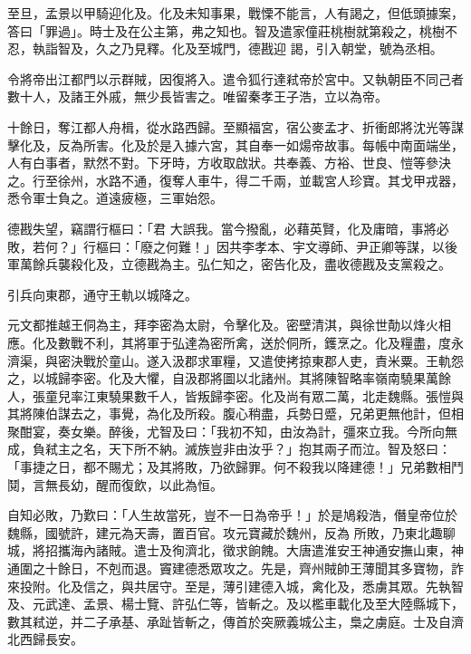 \begin{pinyinscope}
 至旦，孟景以甲騎迎化及。化及未知事果，戰慄不能言，人有謁之，但低頭據案，答曰「罪過」。時士及在公主第，弗之知也。智及遣家僮莊桃樹就第殺之，桃樹不忍，執詣智及，久之乃見釋。化及至城門，德戡迎
 謁，引入朝堂，號為丞相。



 令將帝出江都門以示群賊，因復將入。遣令狐行達弒帝於宮中。又執朝臣不同己者數十人，及諸王外戚，無少長皆害之。唯留秦孝王子浩，立以為帝。



 十餘日，奪江都人舟楫，從水路西歸。至顯福宮，宿公麥孟才、折衝郎將沈光等謀擊化及，反為所害。化及於是入據六宮，其自奉一如煬帝故事。每帳中南面端坐，人有白事者，默然不對。下牙時，方收取啟狀。共奉義、方裕、世良、愷等參決之。行至徐州，水路不通，復奪人車牛，得二千兩，並載宮人珍寶。其戈甲戎器，悉令軍士負之。道遠疲極，三軍始怨。



 德戡失望，竊謂行樞曰：「君
 大誤我。當今撥亂，必藉英賢，化及庸暗，事將必敗，若何？」行樞曰：「廢之何難！」因共李孝本、宇文導師、尹正卿等謀，以後軍萬餘兵襲殺化及，立德戡為主。弘仁知之，密告化及，盡收德戡及支黨殺之。



 引兵向東郡，通守王軌以城降之。



 元文都推越王侗為主，拜李密為太尉，令擊化及。密壁清淇，與徐世勣以烽火相應。化及數戰不利，其將軍于弘達為密所禽，送於侗所，鑊烹之。化及糧盡，度永濟渠，與密決戰於童山。遂入汲郡求軍糧，又遣使拷掠東郡人吏，責米粟。王軌怨之，以城歸李密。化及大懼，自汲郡將圖以北諸州。其將陳智略率嶺南驍果萬餘
 人，張童兒率江東驍果數千人，皆叛歸李密。化及尚有眾二萬，北走魏縣。張愷與其將陳伯謀去之，事覺，為化及所殺。腹心稍盡，兵勢日蹙，兄弟更無他計，但相聚酣宴，奏女樂。醉後，尤智及曰：「我初不知，由汝為計，彊來立我。今所向無成，負弒主之名，天下所不納。滅族豈非由汝乎？」抱其兩子而泣。智及怒曰：「事捷之日，都不賜尤；及其將敗，乃欲歸罪。何不殺我以降建德！」兄弟數相鬥鬩，言無長幼，醒而復飲，以此為恒。



 自知必敗，乃歎曰：「人生故當死，豈不一日為帝乎！」於是鳩殺浩，僭皇帝位於魏縣，國號許，建元為天壽，置百官。攻元寶藏於魏州，反為
 所敗，乃東北趣聊城，將招攜海內諸賊。遣士及徇濟北，徵求餉餽。大唐遣淮安王神通安撫山東，神通圍之十餘日，不剋而退。竇建德悉眾攻之。先是，齊州賊帥王薄聞其多寶物，詐來投附。化及信之，與共居守。至是，薄引建德入城，禽化及，悉虜其眾。先執智及、元武達、孟景、楊士覽、許弘仁等，皆斬之。及以檻車載化及至大陸縣城下，數其弒逆，并二子承基、承趾皆斬之，傳首於突厥義城公主，梟之虜庭。士及自濟北西歸長安。




\end{pinyinscope}
